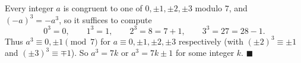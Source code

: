 Every integer $a$ is congruent to one of $0,\pm1,\pm2,\pm3$ modulo $7$, and $(-a)^3=-a^3$, so it suffices to compute
\[
0^3=0,\qquad 1^3=1,\qquad 2^3=8=7+1,\qquad 3^3=27=28-1 .
\]
Thus $a^3\equiv0,\pm1\pmod7$ for $a\equiv0,\pm1,\pm2,\pm3$ respectively (with $(\pm2)^3\equiv\pm1$ and $(\pm3)^3\equiv\mp1$). So $a^3=7k$ or $a^3=7k\pm1$ for some integer $k$. $\blacksquare$
